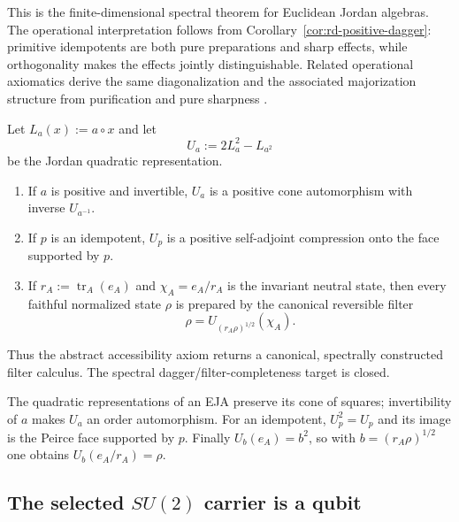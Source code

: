 \begin{proofsketch}
This is the finite-dimensional spectral theorem for Euclidean Jordan algebras.  The
operational interpretation follows from Corollary~\ref{cor:rd-positive-dagger}:
primitive idempotents are both pure preparations and sharp effects, while
orthogonality makes the effects jointly distinguishable.  Related operational
axiomatics derive the same diagonalization and the associated majorization structure
from purification and pure sharpness \cite{chiribella-scandolo-diagonal}.
\end{proofsketch}

\begin{theorem}
\label{thm:rd-filter-completeness}
Let $L_a(x):=a\circ x$ and let
\[
 U_a:=2L_a^2-L_{a^2}
\]
be the Jordan quadratic representation.
\begin{enumerate}[label=\textup{(\roman*)},leftmargin=2.2em]
\item If $a$ is positive and invertible, $U_a$ is a positive cone automorphism with
      inverse $U_{a^{-1}}$.
\item If $p$ is an idempotent, $U_p$ is a positive self-adjoint compression onto the
      face supported by $p$.
\item If $r_A:=\operatorname{tr}_A(e_A)$ and
      $\chi_A=e_A/r_A$ is the invariant neutral state, then every faithful normalized
      state $\rho$ is prepared by the canonical reversible filter
      \[
       \rho
       =
       U_{(r_A\rho)^{1/2}}(\chi_A).
      \]
\end{enumerate}
Thus the abstract accessibility axiom returns a canonical, spectrally constructed
filter calculus.  The spectral dagger/filter-completeness target is closed.
\end{theorem}

\begin{proofsketch}
The quadratic representations of an EJA preserve its cone of squares; invertibility
of $a$ makes $U_a$ an order automorphism.  For an idempotent, $U_p^2=U_p$ and its
image is the Peirce face supported by $p$.  Finally $U_b(e_A)=b^2$, so with
$b=(r_A\rho)^{1/2}$ one obtains
$U_b(e_A/r_A)=\rho$.
\end{proofsketch}

\subsection{The selected $SU(2)$ carrier is a qubit}

